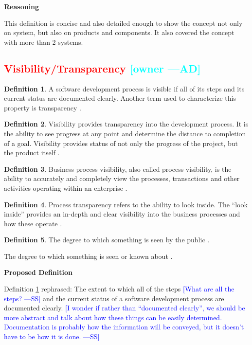 \documentclass[letterpaper,cleveref]{lipics-v2019}
\newcommand{\authornote}[3]{\textcolor{#1}{[#3 ---#2]}}
\newcommand{\authornote}[3]{}
\newcommand{\wss}[1]{\authornote{blue}{SS}{#1}} %
\newcommand{\ad}[1]{\authornote{cyan}{AD}{#1}} %
\newcommand{\notdone}[1]{\textcolor{red}{#1}}
\theoremstyle{definition}
\newtheorem{defn}{Definition}
\begin{document}
\noindent \textbf{Reasoning}

This definition is concise and also detailed enough to show the concept not only
on system, but also on products and components. It also covered the concept with
more than 2 systems.

\subsection{\notdone{Visibility/Transparency} \ad{owner}}

\begin{defn}
  \label{VisibilitySelected}
  A software development process is visible if all of its steps and its current
  status are documented clearly. Another term used to characterize this property
  is transparency \citep{ghezzi1991fundamentals}.
\end{defn}

\begin{defn}
  Visibility provides transparency into the development process. It is the
  ability to see progress at any point and determine the distance to completion
  of a goal.  Visibility provides status of not only the progress of the
  project, but the product itself \citep{GSA2019}.
\end{defn}

\begin{defn}
  Business process visibility, also called process visibility, is the ability to
  accurately and completely view the processes, transactions and other
  activities operating within an enterprise \citep{Rouse2013}.
\end{defn}

\begin{defn}
  Process transparency refers to the ability to look inside. The “look inside”
  provides an in-depth and clear visibility into the business processes and how
  these operate \citep{PRIME2019}.
\end{defn}

\begin{defn}
The degree to which something is seen by the public
\citep{CambridgeVisibility2019}.
	
The degree to which something is seen or known about
\citep{CambridgeVisibility2019}.
\end{defn}

\noindent \textbf{Proposed Definition} 

Definition \ref{VisibilitySelected} rephrased: The extent to which all of the
steps \wss{What are all the steps?} and the current status of a software
development process are documented clearly. \wss{I wonder if rather than
  ``documented clearly'', we should be more abstract and talk about how these
  things can be easily determined.  Documentation is probably how the
  information will be conveyed, but it doesn't have to be how it is done.}
\end{document}
